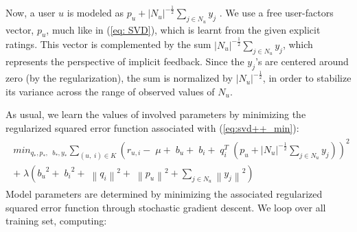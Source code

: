 \documentclass[oneside,13pt]{extreport}
\begin{document}
Now, a user $u$ is modeled as $p_u + {{\left| {{N_u}} \right|}^{ - \frac{1}{2}}}\sum\limits_{j \in  {N_u}} {{y_j}}$ . We use a free user-factors
vector, $p_u$, much like in (\ref{eq: SVD}), which is learnt from the given explicit ratings. This
vector is complemented by the sum ${{\left| {{N_u}} \right|}^{ - \frac{1}{2}}}\sum\limits_{j \in {N_u}} {{y_j}}$, which represents the perspective
of implicit feedback. Since the $y_j$’s are centered around zero (by the regularization),
the sum is normalized by ${{\left| {{N_u}} \right|}^{ - \frac{1}{2}}}$, in order to stabilize its variance
across the range of observed values of $N_u$.

As usual, we learn the values of involved parameters by minimizing the regularized squared error function associated with (\ref{eq:svd++_min}): 
\begin{eqnarray}
\label{eq:svd++_min}
\begin{aligned}
mi{n_{{q_*},{p_*},\;\;{b_*},{y_*}}}\mathop \sum \limits_{\left( {u,\;i} \right) \in K} {\left( {{r_{u,i}} - \;\mu  + \;{b_u} + \;{b_i} + \;q_i^T\;\left( {{p_u} + {{\left| {{N_u}} \right|}^{ - \frac{1}{2}}}\sum\limits_{j  \in {N_u}} {{y_j}} } \right)} \right)^2} \\+ \;\lambda \left( {{b_u}^2 + \;{b_i}^2 + \;{{\left\| {{q_i}} \right\|}^2} + \;{{\left\| {{p_u}} \right\|}^2} + \sum\limits_{j \in {N_u}} {{{\left\| {{y_j}} \right\|}^2}} } \right)
\end{aligned}
\end{eqnarray}
Model parameters are determined by minimizing the associated regularized
squared error function through stochastic gradient descent. We loop over all training set, computing:
\end{document}
